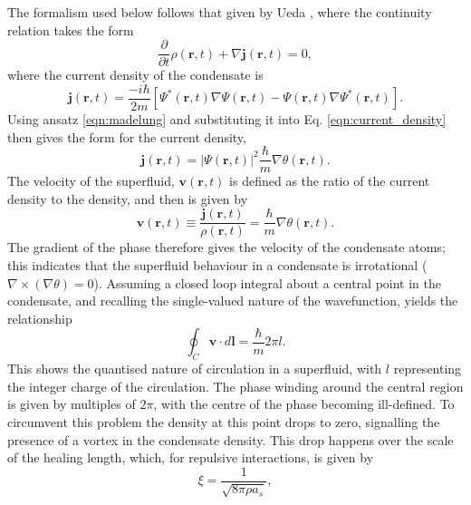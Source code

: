 The formalism used below follows that given by Ueda \cite{BK:Ueda_2010}, where the continuity relation takes the form
\begin{equation}\label{eqn:continuity}
\frac{\partial}{\partial t}\rho(\textbf{r},t)  + \nabla \textbf{j}(\textbf{r},t) = 0,
\end{equation}
where the current density of the condensate is
\begin{equation}\label{eqn:current_density}
\textbf{j}(\textbf{r},t) = \frac{-i\hbar}{2m}\left[\Psi^*(\textbf{r},t)\nabla\Psi(\textbf{r},t) - \Psi(\textbf{r},t)\nabla\Psi^*(\textbf{r},t)\right].
\end{equation}
Using ansatz \eqref{eqn:madelung} and substituting it into Eq. \eqref{eqn:current_density} then gives the form for the current density,
\begin{equation}
\textbf{j}(\textbf{r},t) = \vert\Psi(\textbf{r},t)\vert ^2\frac{\hbar}{m}\nabla\theta(\textbf{r},t).
\end{equation}
The velocity of the superfluid, $\textbf{v}(\textbf{r},t)$ is defined as the ratio of the current density to the density, and then is given by
\begin{equation}\label{eqn:velocity}
\textbf{v}(\textbf{r},t)\equiv \frac{\textbf{j}(\textbf{r},t)}{\rho(\textbf{r},t)} = \frac{\hbar}{m}\nabla\theta(\textbf{r},t).
\end{equation}
The gradient of the phase therefore gives the velocity of the condensate atoms; this indicates that the superfluid behaviour in a condensate is irrotational ($\nabla\times(\nabla\theta) =0$). Assuming a closed loop integral about a central point in the condensate, and recalling the single-valued nature of the wavefunction, yields the relationship
\begin{equation}\label{eqn:circulation}
\oint_C \textbf{v}\cdot d\textbf{l} = \frac{\hbar}{m}2\pi l.
\end{equation}
This shows the quantised nature of circulation in a superfluid, with $l$ representing the integer charge of the circulation. The phase winding around the central region is given by multiples of $2\pi$, with the centre of the phase becoming ill-defined. To circumvent this problem the density at this point drops to zero, signalling the presence of a vortex in the condensate density. This drop happens over the scale of the healing length, which, for repulsive interactions, is given by
\begin{equation}
\xi = \frac{1}{\sqrt{8\pi \rho a_s}},
\end{equation}
